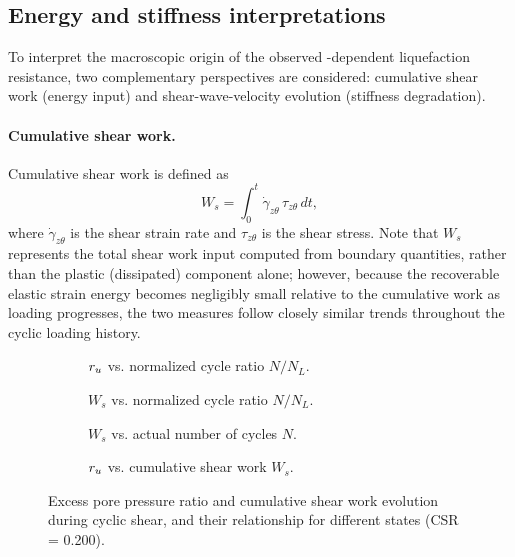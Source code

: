 \subsection{Energy and stiffness interpretations}
\label{subsec:energy_stiffness}

To interpret the macroscopic origin of the observed \Kzero{}-dependent liquefaction resistance, two complementary perspectives are considered: cumulative shear work (energy input) and shear-wave-velocity evolution (stiffness degradation).

\paragraph{Cumulative shear work.}
Cumulative shear work is defined as \citep{TowhataIshihara1985}
\begin{equation}
W_s = \int_0^t \dot{\gamma}_{z\theta}\,\tau_{z\theta}\,dt,
\label{eq:cumulative_shear_work}
\end{equation}
where $\dot{\gamma}_{z\theta}$ is the shear strain rate and $\tau_{z\theta}$ is the shear stress. Note that $W_s$ represents the total shear work input computed from boundary quantities, rather than the plastic (dissipated) component alone; however, because the recoverable elastic strain energy becomes negligibly small relative to the cumulative work as loading progresses, the two measures follow closely similar trends throughout the cyclic loading history.

\begin{figure}[t]
  \centering
  \begin{subfigure}[t]{0.48\textwidth}
    \centering
    \caption{$r_u$ vs. normalized cycle ratio $N/N_L$.}
    \label{fig:energy_work_a}
  \end{subfigure}
  \hfill
  \begin{subfigure}[t]{0.48\textwidth}
    \centering
    \caption{$W_s$ vs. normalized cycle ratio $N/N_L$.}
    \label{fig:energy_work_b}
  \end{subfigure}

  \vspace{0.5em}

  \begin{subfigure}[t]{0.48\textwidth}
    \centering
    \caption{$W_s$ vs. actual number of cycles $N$.}
    \label{fig:energy_work_c}
  \end{subfigure}
  \hfill
  \begin{subfigure}[t]{0.48\textwidth}
    \centering
    \caption{$r_u$ vs. cumulative shear work $W_s$.}
    \label{fig:energy_work_d}
  \end{subfigure}
  \caption{Excess pore pressure ratio and cumulative shear work evolution during cyclic shear, and their relationship for different \Kzero{} states (CSR = 0.200).}
  \label{fig:energy_work}
\end{figure}

